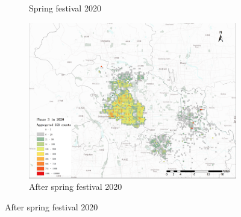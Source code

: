 \documentclass[preprints,ijgi,submit,moreauthors]{Definitions/mdpi}
\begin{document}
\begin{figure}[H]
\begin{subfigure}{.3\textwidth}
        \caption{Spring festival 2020}
    \end{subfigure}
    \begin{subfigure}{.3\textwidth}
        \includegraphics[width=\textwidth]{Figures/2020phase3(1).png}
        \caption{After spring festival 2020}
    \end{subfigure}
    

\end{figure}
\end{document}
